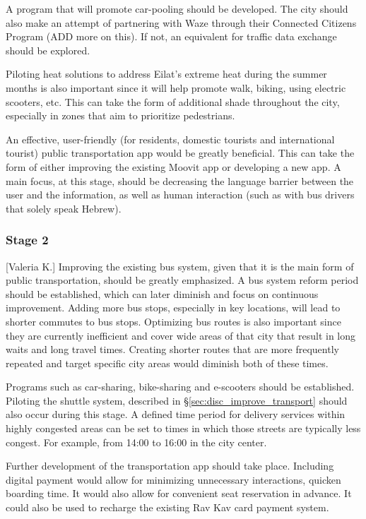 \documentclass[12pt]{article}                       %
\begin{document}
A program that will promote car-pooling should be developed. The city should also make an attempt of partnering with Waze through their Connected Citizens Program (ADD more on this). If not, an equivalent for traffic data exchange should be explored.

Piloting heat solutions to address Eilat's extreme heat during the summer months is also important since it will help promote walk, biking, using electric scooters, etc. This can take the form of additional shade throughout the city, especially in zones that aim to prioritize pedestrians. 

An effective, user-friendly (for residents, domestic tourists and international tourist) public transportation app would be greatly beneficial. This can take the form of either improving the existing Moovit app or developing a new app. A main focus, at this stage, should be decreasing the language barrier between the user and the information, as well as human interaction (such as with bus drivers that solely speak Hebrew).

\subsubsection{Stage 2}[Valeria K.]
Improving the existing bus system, given that it is the main form of public transportation, should be greatly emphasized. A bus system reform period should be established, which can later diminish and focus on continuous improvement. Adding more bus stops, especially in key locations, will lead to shorter commutes to bus stops. Optimizing bus routes is also important since they are currently inefficient and cover wide areas of that city that result in long waits and long travel times. Creating shorter routes that are more frequently repeated and target specific city areas would diminish both of these times. 

Programs such as car-sharing, bike-sharing and e-scooters should be established. Piloting the shuttle system, described in \S\ref{sec:disc_improve_transport} should also occur during this stage. A defined time period for delivery services within highly congested areas can be set to times in which those streets are typically less congest. For example, from 14:00 to 16:00 in the city center. 

Further development of the transportation app should take place. Including digital payment would allow for minimizing unnecessary interactions, quicken boarding time. It would also allow for convenient seat reservation in advance. It could also be used to recharge the existing Rav Kav card payment system.
\end{document}
